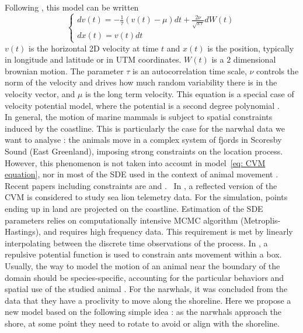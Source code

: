 \documentclass[11pt]{article}
\newcommand {\1}{\mathbb{1}}
\begin{document}
 Following \cite{gurarie_correlated_2017}, this model can be written
\begin{equation} \left\{
	\begin{array}{l}
		dv(t)=-\frac{1}{\tau} (v(t) -\mu)dt+\frac{2\nu}{\sqrt{\pi \tau}} dW(t) \\
		dx(t)=v(t) dt
	\end{array}
	\right.
	\label{eq: CVM equation}
\end{equation}
$v(t)$ is the horizontal 2D velocity at time $t$ and $x(t)$ is the position, typically in longitude and latitude or in UTM coordinates. $W(t)$ is a $2$ dimensional brownian motion. 
The parameter $\tau$ is an autocorrelation time scale, $\nu$ controls the norm of the velocity and drives how much random variability there is in the velocity vector, and $\mu$ is the long term velocity. This equation is a special case of velocity potential model, where the potential is a second degree polynomial \cite{preisler_analyzing_2013}. \\


In general, the motion of marine mammals is subject to spatial constraints induced by the coastline. This is particularly the case for the narwhal data we want to analyse : the animals move in a complex system of fjords in Scoresby Sound (East Greenland), imposing strong constraints on the location process. However, this phenomenon is not taken into account in model~\ref{eq: CVM equation}, nor in most of the SDE used in the context of animal movement \cite{johnson_continuous_2008,michelot_varying-coefficient_2021,gurarie_correlated_2017}. 
Recent papers including constraints are \cite{hanks_reflected_2017} and \cite{russell_spatially_2018}.
 In \cite{hanks_reflected_2017}, a reflected version of the CVM is considered to study sea lion telemetry data.
For the simulation, points ending up in land are projected on the coastline.  Estimation of the SDE parameters relies on computationally intensive MCMC algorithm (Metroplis-Hastings), and requires high frequency data. This requirement is met by linearly interpolating between the discrete time observations of the process.
In \cite{russell_spatially_2018}, a repulsive potential function is used to constrain ants movement within a box.
Usually, the way to model the motion of an animal near the boundary of the domain should be species-specific, accounting for the particular behaviors and spatial use of the studied animal \cite{brillinger_simulating_2003}. For the narwhals, it was concluded from the data that they have a proclivity to move along the shoreline. Here we propose a new model based on the following simple idea : as the narwhals approach the shore, at some point they need to rotate to avoid or align with the shoreline.
\end{document}
